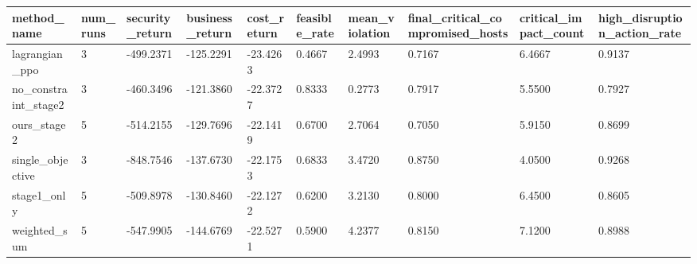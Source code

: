 \begin{tabular}{llllllllll}
\hline
method_name & num_runs & security_return & business_return & cost_return & feasible_rate & mean_violation & final_critical_compromised_hosts & critical_impact_count & high_disruption_action_rate \\
\hline
lagrangian_ppo & 3 & -499.2371 & -125.2291 & -23.4263 & 0.4667 & 2.4993 & 0.7167 & 6.4667 & 0.9137 \\
no_constraint_stage2 & 3 & -460.3496 & -121.3860 & -22.3727 & 0.8333 & 0.2773 & 0.7917 & 5.5500 & 0.7927 \\
ours_stage2 & 5 & -514.2155 & -129.7696 & -22.1419 & 0.6700 & 2.7064 & 0.7050 & 5.9150 & 0.8699 \\
single_objective & 3 & -848.7546 & -137.6730 & -22.1753 & 0.6833 & 3.4720 & 0.8750 & 4.0500 & 0.9268 \\
stage1_only & 5 & -509.8978 & -130.8460 & -22.1272 & 0.6200 & 3.2130 & 0.8000 & 6.4500 & 0.8605 \\
weighted_sum & 5 & -547.9905 & -144.6769 & -22.5271 & 0.5900 & 4.2377 & 0.8150 & 7.1200 & 0.8988 \\
\hline
\end{tabular}